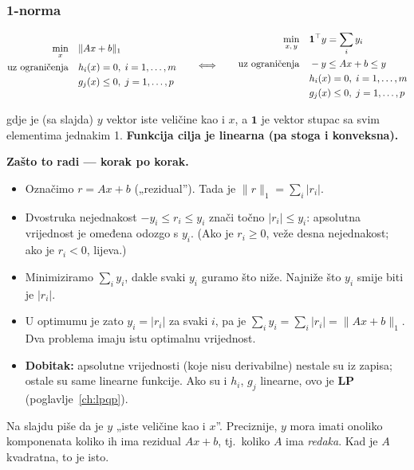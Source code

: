\subsubsection*{1-norma }

\[
\begin{aligned}
\min_x \quad & \|Ax + b\|_1 \\
\uzogr & h_i(x) = 0,\; i=1,\dots,m \\
& g_j(x) \le 0,\; j = 1,\dots,p
\end{aligned}
\qquad\Longleftrightarrow\qquad
\begin{aligned}
\min_{x,\,y} \quad & \mathbf{1}\T y = \sum_i y_i \\
\uzogr & -y \le Ax + b \le y \\
& h_i(x) = 0,\; i=1,\dots,m \\
& g_j(x) \le 0,\; j = 1,\dots,p
\end{aligned}
\]

gdje je (sa slajda) $y$ vektor iste veličine kao i $x$, a $\mathbf{1}$ je
vektor stupac sa svim elementima jednakim 1. \textbf{Funkcija cilja je linearna
(pa stoga i konveksna).}

\textbf{Zašto to radi --- korak po korak.}
\begin{itemize}
  \item Označimo $r = Ax + b$ („rezidual”). Tada je
        $\|r\|_1 = \sum_i |r_i|$.
  \item Dvostruka nejednakost $-y_i \le r_i \le y_i$ znači točno
        $|r_i| \le y_i$: apsolutna vrijednost je omeđena odozgo s $y_i$.
        (Ako je $r_i \ge 0$, veže desna nejednakost; ako je $r_i < 0$, lijeva.)
  \item Minimiziramo $\sum_i y_i$, dakle svaki $y_i$ guramo što niže. Najniže
        što $y_i$ smije biti je $|r_i|$.
  \item U optimumu je zato $y_i = |r_i|$ za svaki $i$, pa je
        $\sum_i y_i = \sum_i |r_i| = \|Ax+b\|_1$. Dva problema imaju istu
        optimalnu vrijednost. \checkmark
  \item \textbf{Dobitak:} apsolutne vrijednosti (koje nisu derivabilne) nestale
        su iz zapisa; ostale su same linearne funkcije. Ako su i $h_i$, $g_j$
        linearne, ovo je \textbf{LP} (poglavlje~\ref{ch:lpqp}).
\end{itemize}

\begin{napomena}
Na slajdu piše da je $y$ „iste veličine kao i $x$”. Preciznije, $y$ mora imati
onoliko komponenata koliko ih ima rezidual $Ax + b$, tj.\ koliko $A$ ima
\emph{redaka}. Kad je $A$ kvadratna, to je isto.
\end{napomena}

